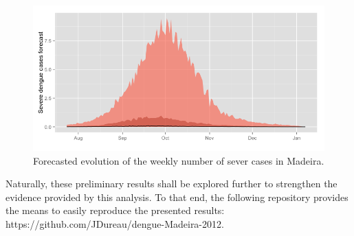 \documentclass[a4paper,11pt,titlepage]{article}
\theoremstyle{plain} %
\begin{document}
\begin{figure}[H]
\begin{centering}
\includegraphics[scale=0.5]{Dengue_forecast.png}
\par\end{centering}
\caption{\label{fig:dengue_forecast}Forecasted evolution of the weekly number of sever cases in Madeira.}
\end{figure}



Naturally, these preliminary results shall be explored further to strengthen the evidence provided by this analysis. To that end, the following repository provides the means to easily reproduce the presented results: https://github.com/JDureau/dengue-Madeira-2012.












 
\end{document}
